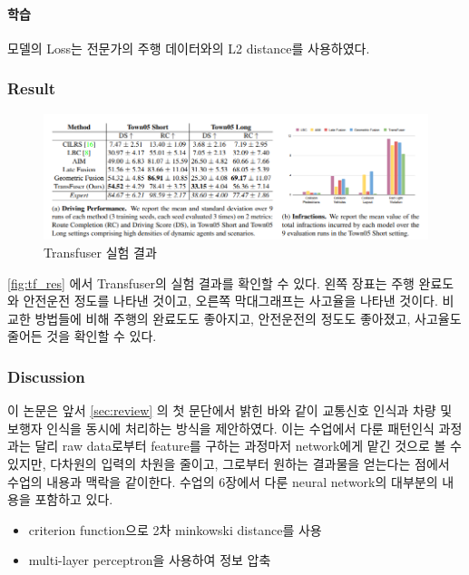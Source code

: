 \paragraph*{학습}
모델의 Loss는 전문가의 주행 데이터와의 L2 distance를 사용하였다. 

\subsubsection{Result}
\begin{figure}[htp]
    \centering
    \includegraphics[width=0.8\linewidth]{figures/Transfuser_result.png}
    \caption{Transfuser 실험 결과}
    \label{fig:tf_res}
\end{figure}
\autoref{fig:tf_res} 에서 Transfuser의 실험 결과를 확인할 수 있다.
왼쪽 장표는 주행 완료도와 안전운전 정도를 나타낸 것이고,
오른쪽 막대그래프는 사고율을 나타낸 것이다.
비교한 방법들에 비해 주행의 완료도도 좋아지고,
안전운전의 정도도 좋아졌고,
사고율도 줄어든 것을 확인할 수 있다.

\subsubsection{Discussion}
이 논문은 앞서 \autoref{sec:review} 의 첫 문단에서 밝힌 바와 같이
교통신호 인식과 차량 및 보행자 인식을 동시에 처리하는 방식을 제안하였다.
이는 수업에서 다룬 패턴인식 과정과는 달리 raw data로부터 feature를 구하는 과정마저
network에게 맡긴 것으로 볼 수 있지만, 다차원의 입력의 차원을 줄이고,
그로부터 원하는 결과물을 얻는다는 점에서 수업의 내용과 맥락을 같이한다.
수업의 6장에서 다룬 neural network의 대부분의 내용을 포함하고 있다.
\begin{itemize}\tightlist
    \item criterion function으로 2차 minkowski distance를 사용
    \item multi-layer perceptron을 사용하여 정보 압축
\end{itemize}



